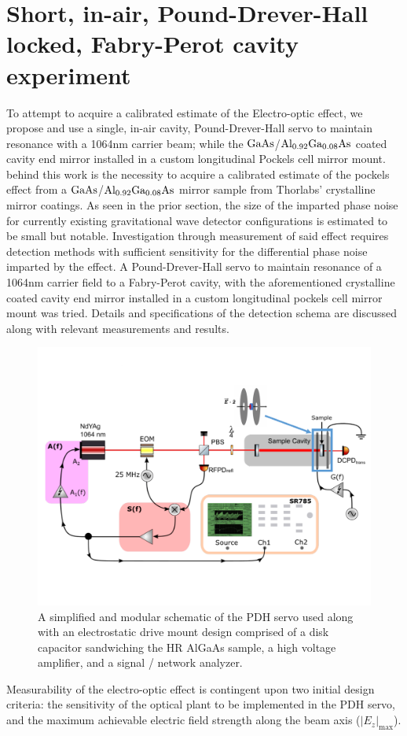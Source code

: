 \section{Short, in-air, Pound-Drever-Hall locked, Fabry-Perot cavity experiment}
 To attempt to acquire a calibrated estimate of the Electro-optic effect, we propose and use a single, in-air cavity, Pound-Drever-Hall servo to maintain resonance with a 1064nm carrier beam; while the $\mathrm{GaAs}$/$\mathrm{Al_{0.92}Ga_{0.08}As}$ coated cavity end mirror installed in a custom longitudinal Pockels cell mirror mount. behind this work is the necessity to acquire a calibrated estimate of the pockels effect from a $\mathrm{GaAs}$/$\mathrm{Al_{0.92}Ga_{0.08}As}$ mirror sample from Thorlabs' crystalline mirror coatings. As seen in the prior section, the size of the imparted phase noise for currently existing gravitational wave detector configurations is estimated to be small but notable. Investigation through measurement of said effect requires detection methods with sufficient sensitivity for the differential phase noise imparted by the effect. A Pound-Drever-Hall servo to maintain resonance of a 1064nm carrier field to a Fabry-Perot cavity, with the aforementioned crystalline coated cavity end mirror installed in a custom longitudinal pockels cell mirror mount was tried. Details and specifications of the detection schema are discussed along with relevant measurements and results.

\begin{figure}[H]
	\includegraphics[width=\textwidth]{figs/ALGAAS/algaas_pockels_effect_measurement_schematic.pdf}
	\caption{A simplified and modular schematic of the PDH servo used along with an electrostatic drive mount design comprised of a disk capacitor sandwiching the HR AlGaAs sample, a high voltage amplifier, and a signal / network analyzer.}
\label{fig:simplified_experiment_schema}
\end{figure}
 Measurability of the electro-optic effect is contingent upon two initial design criteria: the sensitivity of the optical plant to be implemented in the PDH servo, and the maximum achievable electric field strength along the beam axis ($|E_z|_\mathrm{max}$).

